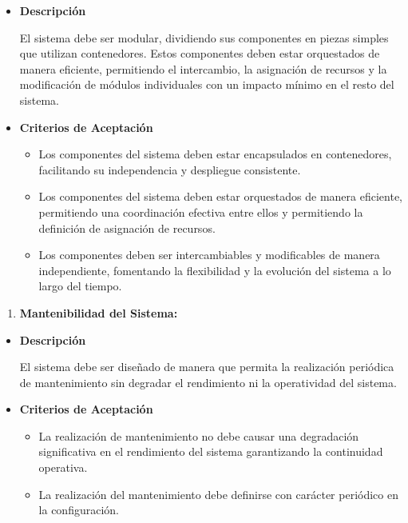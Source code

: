\documentclass[
  12pt,
  openany]{book}
\providecommand{\tightlist}{%
  \setlength{\itemsep}{0pt}\setlength{\parskip}{0pt}}
\begin{document}
\begin{itemize}
\item
  \textbf{Descripción}

  El sistema debe ser modular, dividiendo sus componentes en piezas simples que utilizan contenedores. Estos componentes deben estar orquestados de manera eficiente, permitiendo el intercambio, la asignación de recursos y la modificación de módulos individuales con un impacto mínimo en el resto del sistema.
\item
  \textbf{Criterios de Aceptación}

  \begin{itemize}
  \item
    Los componentes del sistema deben estar encapsulados en contenedores, facilitando su independencia y despliegue consistente.
  \item
    Los componentes del sistema deben estar orquestados de manera eficiente, permitiendo una coordinación efectiva entre ellos y permitiendo la definición de asignación de recursos.
  \item
    Los componentes deben ser intercambiables y modificables de manera independiente, fomentando la flexibilidad y la evolución del sistema a lo largo del tiempo.
  \end{itemize}
\end{itemize}

\begin{enumerate}
\def\labelenumi{\arabic{enumi}.}
\setcounter{enumi}{5}
\tightlist
\item
  \textbf{Mantenibilidad del Sistema:}
\end{enumerate}

\begin{itemize}
\item
  \textbf{Descripción}

  El sistema debe ser diseñado de manera que permita la realización periódica de mantenimiento sin degradar el rendimiento ni la operatividad del sistema.
\item
  \textbf{Criterios de Aceptación}

  \begin{itemize}
  \item
    La realización de mantenimiento no debe causar una degradación significativa en el rendimiento del sistema garantizando la continuidad operativa.
  \item
    La realización del mantenimiento debe definirse con carácter periódico en la configuración.
  \end{itemize}
\end{itemize}
\end{document}
